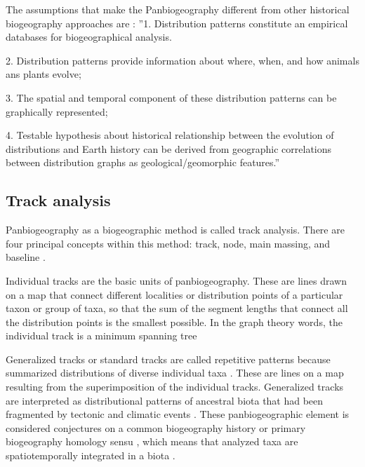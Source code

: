 The assumptions that make the Panbiogeography different from other historical
biogeography approaches are \citep[][:19]{Crawetal1999}:
''1. Distribution patterns constitute an empirical databases for biogeographical
analysis.

2. Distribution patterns provide information about where, when, and how animals
ans plants evolve;

3. The spatial and temporal component of these distribution patterns can be
graphically represented;

4. Testable hypothesis about historical relationship between the evolution of
distributions and Earth history can be derived from geographic correlations
between distribution graphs as geological/geomorphic features.''




\subsection{Track analysis}


Panbiogeography as a biogeographic method is called track analysis. There
are four principal concepts within this method: track, node, main massing, and
baseline \citep{CrisciMorrone1992a, Crawetal1999, Grehan2001a,
Espinosaetal2002}.

Individual tracks are the basic units of panbiogeography. These are lines drawn
on a map that connect different localities or distribution points of a
particular taxon or group of taxa, so that the sum of the segment lengths that
connect all the distribution points is the smallest possible. In the graph
theory words, the individual track is a minimum spanning tree
\citep{Crawetal1999, Morrone2004c, Page1987}

Generalized tracks or standard tracks are called repetitive patterns because
summarized distributions of diverse individual taxa \citep{Michaux1989}. These
are lines on a map resulting from the superimposition of the individual tracks.
Generalized tracks are interpreted as distributional patterns of ancestral biota
that had been fragmented by tectonic and climatic events \citep{Craw1988}. These
panbiogeographic element is considered conjectures on a common biogeography
history or primary biogeography homology sensu  \citet{Morrone2001a}, which means
that analyzed taxa are spatiotemporally integrated in a biota \citep{Craw1983a,
Morrone2001a, Morrone2004c}.

